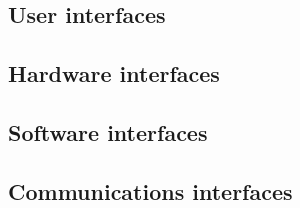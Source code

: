 \subsection{User interfaces}
\subsection{Hardware interfaces}
\subsection{Software interfaces}
\subsection{Communications interfaces}